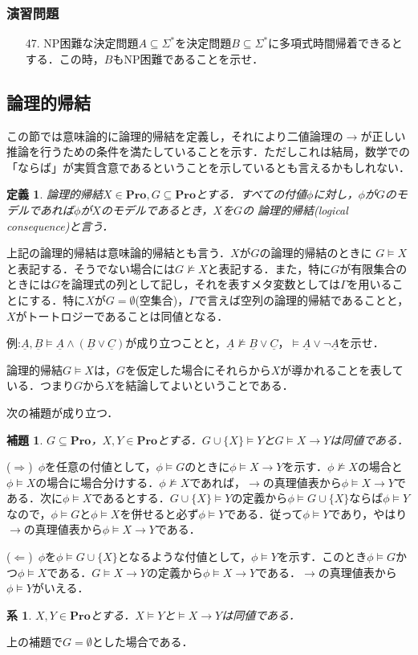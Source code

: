 \documentclass{ltjsarticle}
\makeatletter
\theoremstyle{mystyle1}
\newtheorem{cor}[dfn]{系}
\newtheorem{lem}[dfn]{補題}
\theoremstyle{mystyle2}
\newtheorem{dfn*}{定義}
\renewenvironment{proof}[1][\proofname]{\par
  \pushQED{\qed}%
  \normalfont
  \topsep6\p@\@plus6\p@ \trivlist
  \item[\hskip\labelsep{\bfseries\sffamily #1}]\ignorespaces
}{%
  \popQED\endtrivlist\@endpefalse
}
\renewcommand\proofname{\ensuremath{\because}}
\newcommand{\uA}{\underline{A}}
\newcommand{\uB}{\underline{B}}
\newcommand{\uC}{\underline{C}}
\newcommand{\bPro}{\ensuremath{\mathbf{Pro}}}
\newcommand{\red}[1]{{\color{red} #1}}
\makeatother
\begin{document}
\subsubsection*{演習問題}
\begin{enumerate}
  \item[47.] NP困難な決定問題$A\subseteq\Sigma^\ast$を決定問題$B\subseteq\Sigma^\ast$に多項式時間帰着できるとする．この時，$B$もNP困難であることを示せ．
\end{enumerate}
\subsection{論理的帰結}
この節では意味論的に論理的帰結を定義し，それにより二値論理の$\to$が正しい推論を行うための条件を満たしていることを示す．ただしこれは結局，数学での「ならば」が実質含意であるということを示しているとも言えるかもしれない．
\begin{dfn*}
  論理的帰結$X\in\bPro,G\subseteq\bPro$とする．すべての付値$\phi$に対し，$\phi$が$G$のモデルであれば$\phi$が$X$のモデルであるとき，$X$を$G$の\red{論理的帰結}(logical consequence)と言う．
\end{dfn*}
上記の論理的帰結は意味論的帰結とも言う．$X$が$G$の論理的帰結のときに\red{$G\models X$}と表記する．そうでない場合には$G\not\models X$と表記する．また，特に$G$が有限集合のときには$G$を論理式の列として記し，それを表すメタ変数としては$\Gamma$を用いることにする．特に$X$が$G = \emptyset$(空集合)，$\Gamma$で言えば空列の論理的帰結であることと，$X$がトートロジーであることは同値となる．

例:$\uA,\uB\models\uA\wedge\left(\uB\vee\uC\right)$が成り立つことと，$\uA\not\models\uB\vee\uC，\models\uA\vee\neg\uA$を示せ．

論理的帰結$G\models X$は，$G$を仮定した場合にそれらから$X$が導かれることを表している．つまり$G$から$X$を結論してよいということである．

次の補題が成り立つ．
\begin{lem}
  $G\subseteq\bPro$，$X,Y\in\bPro$とする．$G\cup\{X\}\models Y$と$G\models X\to Y$は同値である．
\end{lem}
\begin{proof}
  ($\Rightarrow$)\ $\phi$を任意の付値として，$\phi\models G$のときに$\phi\models X\to Y$を示す．$\phi\not\models X$の場合と$\phi\models X$の場合に場合分けする．$\phi\not\models X$であれば，$\to$の真理値表から$\phi\models X\to Y$である．次に$\phi\models X$であるとする．$G\cup\{X\}\models Y$の定義から$\phi\models G\cup\{X\}$ならば$\phi\models Y$なので，$\phi\models G$と$\phi\models X$を併せると必ず$\phi\models Y$である．従って$\phi\models Y$であり，やはり$\to$の真理値表から$\phi\models X\to Y$である．

  ($\Leftarrow$)\ $\phi$を$\phi\models G\cup\{X\}$となるような付値として，$\phi\models Y$を示す．このとき$\phi\models G$かつ$\phi\models X$である．$G\models X\to Y$の定義から$\phi\models X\to Y$である．$\to$の真理値表から$\phi\models Y$がいえる．
\end{proof}
\begin{cor}
  $X,Y\in\bPro$とする．$X\models Y$と$\models X\to Y$は同値である．
\end{cor}
\begin{proof}
  上の補題で$G = \emptyset$とした場合である．
\end{proof}
\end{document}
